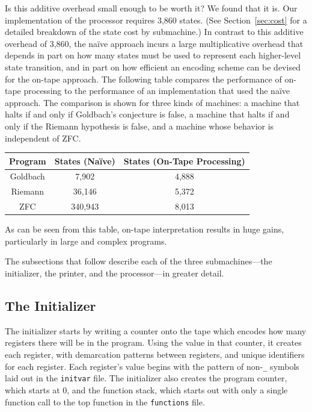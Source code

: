 \documentclass[11pt]{article}
\newcommand{\statenum}{8,013 }
\newcommand{\gbstatenum}{4,888 }
\newcommand{\rmstatenum}{5,372 }
\begin{document}
Is this additive overhead small enough to be worth it? We found that it is. Our implementation of the processor requires 3,860 states. (See Section~\ref{sec:cost} for a detailed breakdown of the state cost by submachine.) In contrast to this additive overhead of 3,860, the na\"ive approach incurs a large multiplicative overhead that depends in part on how many states must be used to represent each higher-level state transition, and in part on how efficient an encoding scheme can be devised for the on-tape approach. The following table compares the performance of on-tape processing to the performance of an implementation that used the na\"ive approach. The comparison is shown for three kinds of machines: a machine that halts if and only if Goldbach's conjecture is false, a machine that halts if and only if the Riemann hypothesis is false, and a machine whose behavior is independent of ZFC. 

\begin{center}
    \begin{tabular}{||c c c||}
    \hline
    Program & States (Na\"ive) & States (On-Tape Processing) \\ [0.5ex]
    \hline
    Goldbach & 7,902 & \gbstatenum\\
    \hline
    Riemann & 36,146 & \rmstatenum\\
    \hline 
    ZFC & 340,943 & \statenum\\
    \hline
    \end{tabular}
\end{center}

As can be seen from this table, on-tape interpretation results in huge gains, particularly in large and complex programs. 

The subsections that follow describe each of the three submachines---the initializer, the printer, and the processor---in greater detail.
 
\subsection{The Initializer}

The initializer starts by writing a counter onto the tape which encodes how many registers there will be in the program. Using the value in that counter, it creates each register, with demarcation patterns between registers, and unique identifiers for each register. Each register's value begins with the pattern of non-\texttt{\_} symbols laid out in the \texttt{initvar} file. The initializer also creates the program counter, which starts at 0, and the function stack, which starts out with only a single function call to the top function in the \texttt{functions} file.
\end{document}
